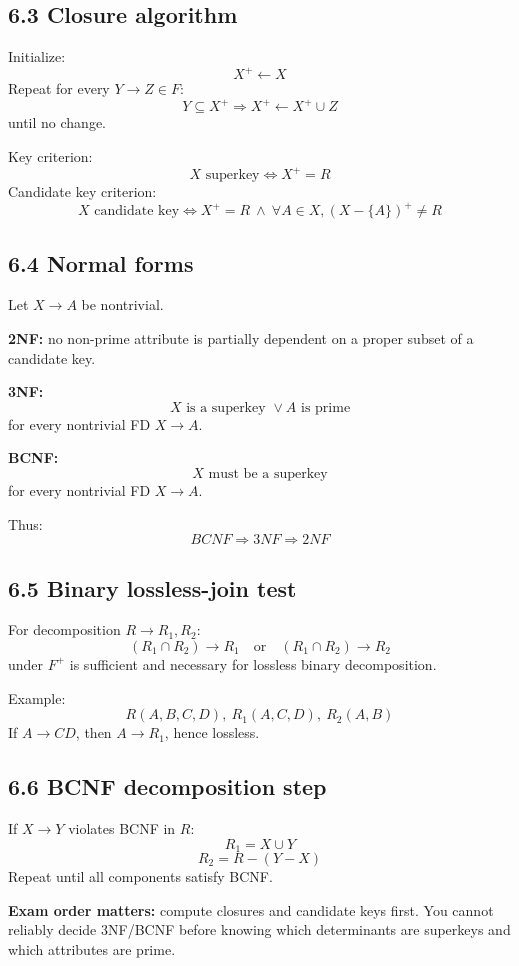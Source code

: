 \documentclass[10pt,a4paper]{article}
\begin{document}
\subsection{6.3 Closure algorithm}
Initialize:
\[
X^+\leftarrow X
\]
Repeat for every $Y\to Z\in F$:
\[
Y\subseteq X^+\Rightarrow X^+\leftarrow X^+\cup Z
\]
until no change.

Key criterion:
\[
X\text{ superkey}\Longleftrightarrow X^+=R
\]
Candidate key criterion:
\[
X\text{ candidate key}\Longleftrightarrow X^+=R\ \land\ \forall A\in X,(X-\{A\})^+\neq R
\]

\subsection{6.4 Normal forms}
Let $X\to A$ be nontrivial.

\textbf{2NF:} no non-prime attribute is partially dependent on a proper subset of a candidate key.

\textbf{3NF:}
\[
\boxed{X\text{ is a superkey }\lor A\text{ is prime}}
\]
for every nontrivial FD $X\to A$.

\textbf{BCNF:}
\[
\boxed{X\text{ must be a superkey}}
\]
for every nontrivial FD $X\to A$.

Thus:
\[
BCNF\Rightarrow 3NF\Rightarrow 2NF
\]

\subsection{6.5 Binary lossless-join test}
For decomposition $R\to R_1,R_2$:
\[
\boxed{(R_1\cap R_2)\to R_1\quad\text{or}\quad(R_1\cap R_2)\to R_2}
\]
under $F^+$ is sufficient and necessary for lossless binary decomposition.

Example:
\[
R(A,B,C,D),\ R_1(A,C,D),\ R_2(A,B)
\]
If $A\to CD$, then $A\to R_1$, hence lossless.

\subsection{6.6 BCNF decomposition step}
If $X\to Y$ violates BCNF in $R$:
\[
R_1=X\cup Y
\]
\[
R_2=R-(Y-X)
\]
Repeat until all components satisfy BCNF.

\begin{warningbox}
\textbf{Exam order matters:} compute closures and candidate keys first. You cannot reliably decide 3NF/BCNF before knowing which determinants are superkeys and which attributes are prime.
\end{warningbox}
\end{document}
